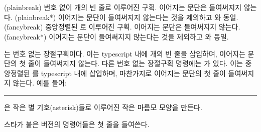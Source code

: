 \begin{syntax}
\cmd{\plainbreak} \cmd{\plainbreak*}  \\
\cmd{\fancybreak} \cmd{\fancybreak*}   \\
\end{syntax} 
\glossary(plainbreak)%
  {}%
  {번호 없이  개의 빈 줄로 이루어진 구획. 이어지는 문단은 들여써지지 않는다.
  }
\glossary(plainbreak*)%
  {}%
  {이어지는 문단이 들여써지지 않는다는 것을 제외하고 와 동일.}
\glossary(fancybreak)%
  {}%
  {중앙정렬된 로 이루어진 구획. 이어지는 문단은 들여써지지 않는다.}
\glossary(fancybreak*)%
  {}%
  {이어지는 문단이 들여써지지 않는다는 것을 제외하고 와 동일.}

\cmd{\plainbreak} 는 번호 없는 장절구획이다.
이는 typescript 내에 개의 빈 줄을 삽입하며,
이어지는 문단의 첫 줄이 들여써지지 않는다.
다른 번호 없는 장절구획 명령에는 \cmd{\fancybreak}가 있다.
이는 중앙정렬된 를 typescript 내에 삽입하며,
마찬가지로 이어지는 문단의 첫 줄이 들여써지지 않는다.
예를 들어:
\begin{lcode}
\fancybreak{{*}\\{* * *}\\{*}}
\end{lcode}
은 작은 별 기호(asterisk)들로 이루어진 작은 마름모 모양을 만든다.

스타가 붙은 버전의 명령어들은 첫 줄을 들여쓴다.

